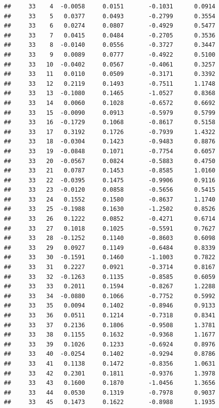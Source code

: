 \documentclass[
]{article}
\begin{document}
\begin{verbatim}
##     33    4  -0.0058     0.0151       -0.1031      0.0914 
##     33    5   0.0377     0.0493       -0.2799      0.3554 
##     33    6   0.0274     0.0807       -0.4929      0.5477 
##     33    7   0.0415     0.0484       -0.2705      0.3536 
##     33    8  -0.0140     0.0556       -0.3727      0.3447 
##     33    9   0.0089     0.0777       -0.4922      0.5100 
##     33   10  -0.0402     0.0567       -0.4061      0.3257 
##     33   11   0.0110     0.0509       -0.3171      0.3392 
##     33   12   0.2119     0.1493       -0.7511      1.1748 
##     33   13  -0.1080     0.1465       -1.0527      0.8368 
##     33   14   0.0060     0.1028       -0.6572      0.6692 
##     33   15  -0.0090     0.0913       -0.5979      0.5799 
##     33   16  -0.1729     0.1068       -0.8617      0.5158 
##     33   17   0.3192     0.1726       -0.7939      1.4322 
##     33   18  -0.0304     0.1423       -0.9483      0.8876 
##     33   19  -0.0848     0.1071       -0.7754      0.6057 
##     33   20  -0.0567     0.0824       -0.5883      0.4750 
##     33   21   0.0787     0.1453       -0.8585      1.0160 
##     33   22  -0.0395     0.1475       -0.9906      0.9116 
##     33   23  -0.0120     0.0858       -0.5656      0.5415 
##     33   24   0.1552     0.1580       -0.8637      1.1740 
##     33   25  -0.1988     0.1630       -1.2502      0.8526 
##     33   26   0.1222     0.0852       -0.4271      0.6714 
##     33   27   0.1018     0.1025       -0.5591      0.7627 
##     33   28  -0.1252     0.1140       -0.8603      0.6098 
##     33   29   0.0927     0.1149       -0.6484      0.8339 
##     33   30  -0.1591     0.1460       -1.1003      0.7822 
##     33   31   0.2227     0.0921       -0.3714      0.8167 
##     33   32  -0.1263     0.1135       -0.8585      0.6059 
##     33   33   0.2011     0.1594       -0.8267      1.2288 
##     33   34  -0.0880     0.1066       -0.7752      0.5992 
##     33   35   0.0094     0.1402       -0.8946      0.9133 
##     33   36   0.0511     0.1214       -0.7318      0.8341 
##     33   37   0.2136     0.1806       -0.9508      1.3781 
##     33   38   0.1155     0.1632       -0.9368      1.1677 
##     33   39   0.1026     0.1233       -0.6924      0.8976 
##     33   40  -0.0254     0.1402       -0.9294      0.8786 
##     33   41   0.1138     0.1472       -0.8356      1.0631 
##     33   42   0.2301     0.1811       -0.9376      1.3978 
##     33   43   0.1600     0.1870       -1.0456      1.3656 
##     33   44   0.0530     0.1319       -0.7978      0.9037 
##     33   45   0.1473     0.1622       -0.8988      1.1935 

\end{verbatim}
\end{document}
